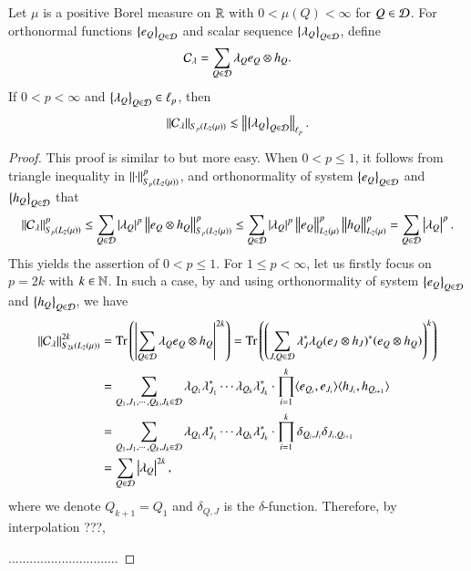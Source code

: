\documentclass[leqno]{amsart}
\begin{document}
\begin{lemma}\label{ONB Sp}
Let $\mu$ is a positive Borel measure on ${\mathbb R}$ with $0<\mu(Q)<\infty$ for $Q\in{\mathcal D}$. For orthonormal functions $\left\{ e_{Q} \right\}_{Q\in{\mathcal D}}$  and scalar sequence $\left\{ \lambda_{Q} \right\}_{Q\in{\mathcal D}}$, define $${\mathcal C}_{\lambda}=\sum_{Q\in{\mathcal D}}\lambda_{Q}e_{Q}\otimes h_{Q}.$$
If $0<p<\infty$ and $\left\{ \lambda_{Q} \right\}_{Q\in{\mathcal D}}\in\ell_{p}$, then 
$$\left\| {\mathcal C}_{\lambda} \right\|_{S_{p}(L_{2}(\mu))}\lesssim\left\| \left\{ \lambda_{Q} \right\}_{Q\in{\mathcal D}} \right\|_{\ell_{p}}.$$
\end{lemma}
\begin{proof}
This proof is similar to  but more easy.
When $0<p\leq1$, it follows from triangle inequality in $\left\| \cdot \right\|_{S_{p}(L_{2}(\mu))}^{p}$, and orthonormality of system $\left\{ e_{Q} \right\}_{Q\in{\mathcal D}}$ and $\left\{ h_{Q} \right\}_{Q\in{\mathcal D}}$ that
\begin{align*}
\left\| {\mathcal C}_{\lambda} \right\|_{S_{p}(L_{2}(\mu))}^{p}
\leq\sum_{Q\in{\mathcal D}}|\lambda_{Q}|^{p}
\left\| e_{Q}\otimes h_{Q} \right\|_{S_{p}(L_{2}(\mu))}^{p}
\leq\sum_{Q\in{\mathcal D}}|\lambda_{Q}|^{p}
\left\| e_{Q} \right\|_{L_{2}(\mu)}^{p}\left\| h_{Q} \right\|_{L_{2}(\mu)}^{p}
=\sum_{Q\in{\mathcal D}}\left|\lambda_{Q}\right|^{p}.
\end{align*}
This yields the assertion of $0<p\leq1$.
For $1\leq p<\infty$, let us firstly focus on $p=2k$ with $k\in\mathbb{N}$. In such a case, by  and using orthonormality of system $\left\{ e_{Q} \right\}_{Q\in{\mathcal D}}$ and $\left\{ h_{Q} \right\}_{Q\in{\mathcal D}}$, we have
\begin{align*}
\left\| {\mathcal C}_{\lambda} \right\|_{S_{2k}(L_{2}(\mu))}^{2k}
&={\rm Tr}\left(\left|\sum_{Q\in{\mathcal D}}\lambda_{Q}e_{Q}\otimes h_{Q}\right|^{2k}\right)
={\rm Tr}\left(\left(\sum_{J,Q\in{\mathcal D}}\lambda_{J}^{*}\lambda_{Q}
(e_{J}\otimes h_{J})^{*}(e_{Q}\otimes h_{Q})\right)^{k}\right)\\
&=\sum_{Q_{1},J_{1},\cdots,Q_{k},J_{k}\in{\mathcal D}}\lambda_{Q_{1}}\lambda_{J_{1}}^{*}
\cdots\lambda_{Q_{k}}\lambda_{J_{k}}^{*}\cdot\prod_{i=1}^{k}\langle e_{Q_{i}},e_{J_{i}} \rangle
\langle h_{J_{i}}, h_{Q_{i+1}} \rangle\\
&=\sum_{Q_{1},J_{1},\cdots,Q_{k},J_{k}\in{\mathcal D}}\lambda_{Q_{1}}\lambda_{J_{1}}^{*}
\cdots\lambda_{Q_{k}}\lambda_{J_{k}}^{*}\cdot\prod_{i=1}^{k}\delta_{Q_{i},J_{i}}\delta_{J_{i},Q_{i+1}}\\
&=\sum_{Q\in{\mathcal D}}\left|\lambda_{Q}\right|^{2k},
\end{align*}
where we denote $Q_{k+1}=Q_{1}$ and $\delta_{Q,J}$ is the $\delta$-function. Therefore, by interpolation ???,





...............................
\end{proof}
\end{document}
